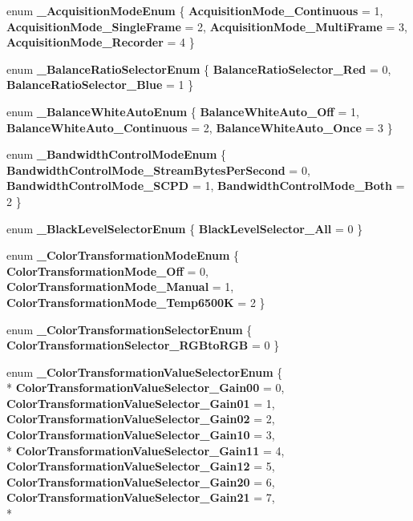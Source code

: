 \begin{DoxyCompactItemize}
\item 
enum {\bfseries \-\_\-\-Acquisition\-Mode\-Enum} \{ {\bfseries Acquisition\-Mode\-\_\-\-Continuous} = 1, 
{\bfseries Acquisition\-Mode\-\_\-\-Single\-Frame} = 2, 
{\bfseries Acquisition\-Mode\-\_\-\-Multi\-Frame} = 3, 
{\bfseries Acquisition\-Mode\-\_\-\-Recorder} = 4
 \}
\item 
enum {\bfseries \-\_\-\-Balance\-Ratio\-Selector\-Enum} \{ {\bfseries Balance\-Ratio\-Selector\-\_\-\-Red} = 0, 
{\bfseries Balance\-Ratio\-Selector\-\_\-\-Blue} = 1
 \}
\item 
enum {\bfseries \-\_\-\-Balance\-White\-Auto\-Enum} \{ {\bfseries Balance\-White\-Auto\-\_\-\-Off} = 1, 
{\bfseries Balance\-White\-Auto\-\_\-\-Continuous} = 2, 
{\bfseries Balance\-White\-Auto\-\_\-\-Once} = 3
 \}
\item 
enum {\bfseries \-\_\-\-Bandwidth\-Control\-Mode\-Enum} \{ {\bfseries Bandwidth\-Control\-Mode\-\_\-\-Stream\-Bytes\-Per\-Second} = 0, 
{\bfseries Bandwidth\-Control\-Mode\-\_\-\-S\-C\-P\-D} = 1, 
{\bfseries Bandwidth\-Control\-Mode\-\_\-\-Both} = 2
 \}
\item 
enum {\bfseries \-\_\-\-Black\-Level\-Selector\-Enum} \{ {\bfseries Black\-Level\-Selector\-\_\-\-All} = 0
 \}
\item 
enum {\bfseries \-\_\-\-Color\-Transformation\-Mode\-Enum} \{ {\bfseries Color\-Transformation\-Mode\-\_\-\-Off} = 0, 
{\bfseries Color\-Transformation\-Mode\-\_\-\-Manual} = 1, 
{\bfseries Color\-Transformation\-Mode\-\_\-\-Temp6500\-K} = 2
 \}
\item 
enum {\bfseries \-\_\-\-Color\-Transformation\-Selector\-Enum} \{ {\bfseries Color\-Transformation\-Selector\-\_\-\-R\-G\-Bto\-R\-G\-B} = 0
 \}
\item 
enum {\bfseries \-\_\-\-Color\-Transformation\-Value\-Selector\-Enum} \{ \\*
{\bfseries Color\-Transformation\-Value\-Selector\-\_\-\-Gain00} = 0, 
{\bfseries Color\-Transformation\-Value\-Selector\-\_\-\-Gain01} = 1, 
{\bfseries Color\-Transformation\-Value\-Selector\-\_\-\-Gain02} = 2, 
{\bfseries Color\-Transformation\-Value\-Selector\-\_\-\-Gain10} = 3, 
\\*
{\bfseries Color\-Transformation\-Value\-Selector\-\_\-\-Gain11} = 4, 
{\bfseries Color\-Transformation\-Value\-Selector\-\_\-\-Gain12} = 5, 
{\bfseries Color\-Transformation\-Value\-Selector\-\_\-\-Gain20} = 6, 
{\bfseries Color\-Transformation\-Value\-Selector\-\_\-\-Gain21} = 7, 
\\*

\end{DoxyCompactItemize}
